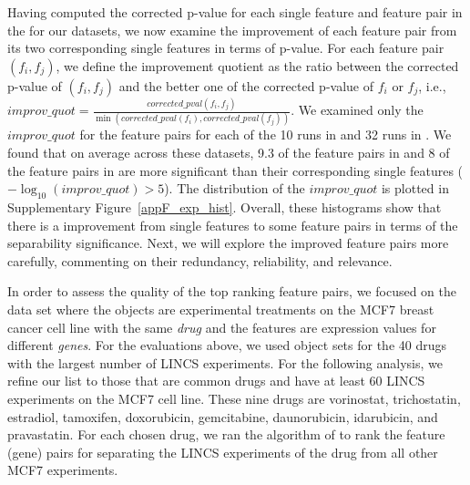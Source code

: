 
 Having computed the corrected p-value for each single feature and feature pair in the \tophundred for our datasets, we now examine the improvement of each feature pair from its two corresponding single features in terms of p-value. For each feature pair $(f_i,f_j)$, we define the improvement quotient as the ratio between the corrected p-value of $(f_i,f_j)$ and the better one of the corrected p-value of $f_i$ or $f_j$, i.e., $improv\_quot = \frac{corrected\_pval(f_i,f_j)}{\min(corrected\_pval(f_i),corrected\_pval(f_j))}$. We examined only the $improv\_quot$ for the \toptwenty feature pairs for each of the 10 runs in \msig and 32 runs in \lincs. We found that on average across these datasets, 9.3 of the \toptwenty feature pairs in \msig and 8 of the \toptwenty feature pairs in \lincs are more significant than their corresponding single features ($-\log_{10} (improv\_quot) > 5$). The distribution of the $improv\_quot$ is plotted in \eat{\histogramdiff} Supplementary Figure~\ref{appF_exp_hist}. Overall, these histograms show that there is a improvement from single features to some feature pairs in terms of the separability significance. Next, we will explore the improved feature pairs more carefully, commenting on their redundancy, reliability, and relevance.



 In order to assess the quality of the top ranking feature pairs, we focused on the \lincs data set where the objects are experimental treatments on the MCF7 breast cancer cell line with the same {\em drug} and the features are expression values for different {\em genes}. For the evaluations above, we used object sets for the 40 drugs with the largest number of LINCS experiments. For the following analysis, we refine our list to those that are common drugs and have at least 60 LINCS experiments on the MCF7 cell line. These nine drugs are vorinostat, trichostatin, estradiol, tamoxifen, doxorubicin, gemcitabine, daunorubicin, idarubicin, and pravastatin. For each chosen drug, we ran the \sampOpt algorithm of \genviz to rank the \topthousand feature (gene) pairs for separating the LINCS experiments of the drug from all other MCF7 experiments.

